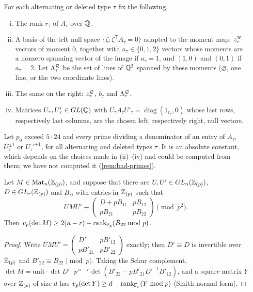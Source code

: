 \begin{definition}\label{def:block-types}
For each alternating or deleted type $\tau$ fix the following.
\begin{enumerate}[(i)]
  \item The rank $r_\tau$ of $A_\tau$ over $\mathbb{Q}$.
  \item A basis of the left null space $\{\zeta:\zeta^{\mathsf T}A_\tau=0\}$ adapted to the moment
  map: $z^{\mathcal{R}}_\tau$ vectors of moment $0$, together with $a_\tau\in\{0,1,2\}$ vectors whose
  moments are a nonzero spanning vector of the image if $a_\tau=1$, and $(1,0)$ and $(0,1)$ if
  $a_\tau=2$. Let $\Lambda^{\mathcal{R}}_\tau$ be the set of lines of $\mathbb{Q}^2$ spanned by these moments
  ($\varnothing$, one line, or the two coordinate lines).
  \item The same on the right: $z^{\mathcal{Q}}_\tau$, $b_\tau$ and $\Lambda^{\mathcal{Q}}_\tau$.
  \item Matrices $U_\tau,U'_\tau\in GL(\mathbb{Q})$ with $U_\tau A_\tau U'_\tau=\operatorname{diag}(1_{r_\tau},0)$
  whose last rows, respectively last columns, are the chosen left, respectively right, null
  vectors.
\end{enumerate}
Let $p_0$ exceed $5\cdot24$ and every prime dividing a denominator of an entry of $A_\tau$,
$U_\tau^{\pm1}$ or $U_\tau'^{\pm1}$, for all alternating and deleted types $\tau$. It is an
absolute constant, which depends on the choices made in (ii)--(iv) and could be computed from
them; we have not computed it (\cref{rem:bad-primes}).
\end{definition}

\begin{lemma}\label{lem:schur-valuation}
Let $M\in\mathrm{Mat}_n(\mathbb{Z}_{(p)})$, and suppose that there are $U,U'\in GL_n(\mathbb{Z}_{(p)})$, $D\in GL_r(\mathbb{Z}_{(p)})$
and $B_{ij}$ with entries in $\mathbb{Z}_{(p)}$ such that
\[
  UMU'\equiv\begin{pmatrix}D+pB_{11}&pB_{12}\\pB_{21}&pB_{22}\end{pmatrix}\pmod{p^2}.
\]
Then $v_p(\det M)\ge2(n-r)-\operatorname{rank}_{\mathbb{F}_p}(B_{22}\bmod p)$.
\end{lemma}

\begin{proof}
Write $UMU'=\begin{pmatrix}D'&pB'_{12}\\pB'_{21}&pB'_{22}\end{pmatrix}$ exactly; then $D'\equiv D$
is invertible over $\mathbb{Z}_{(p)}$ and $B'_{22}\equiv B_{22}\pmod p$. Taking the Schur complement,
$\det M=\text{unit}\cdot\det D'\cdot p^{\,n-r}\det(B'_{22}-pB'_{21}D'^{-1}B'_{12})$, and a square
matrix $Y$ over $\mathbb{Z}_{(p)}$ of size $d$ has $v_p(\det Y)\ge d-\operatorname{rank}_{\mathbb{F}_p}(Y\bmod p)$ (Smith normal form).
\end{proof}

